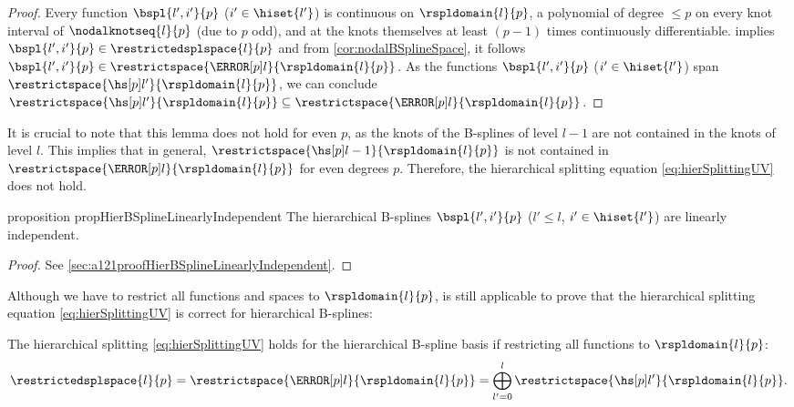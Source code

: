 \begin{proof}
  Every function $\bspl{l',i'}{p}$ ($i' \in \hiset{l'}$) is continuous on
  $\rspldomain{l}{p}$, a polynomial of degree $\le p$ on every knot interval
  of $\nodalknotseq{l}{p}$ (due to $p$ odd),
  and at the knots themselves at least $(p - 1)$ times continuously
  differentiable.
   implies $\bspl{l',i'}{p} \in \restrictedsplspace{l}{p}$
  and from \cref{cor:nodalBSplineSpace}, it follows
  $\bspl{l',i'}{p} \in \restrictspace{\nsbspl{l}{p}}{\rspldomain{l}{p}}$.
  As the functions $\bspl{l',i'}{p}$ ($i' \in \hiset{l'}$) span
  $\restrictspace{\hsbspl{l'}{p}}{\rspldomain{l}{p}}$, we can conclude
  $\restrictspace{\hsbspl{l'}{p}}{\rspldomain{l}{p}} \subset \restrictspace{\nsbspl{l}{p}}{\rspldomain{l}{p}}$.
\end{proof}

\vspace{1em}

It is crucial to note that this lemma does not hold for even $p$,
as the knots of the B-splines of level $l - 1$ are not contained in the
knots of level $l$.
This implies that in general,
$\restrictspace{\hsbspl{l-1}{p}}{\rspldomain{l}{p}}$
is not contained in $\restrictspace{\nsbspl{l}{p}}{\rspldomain{l}{p}}$
for even degrees $p$.
Therefore, the hierarchical splitting equation \eqref{eq:hierSplittingUV}
does not hold.

\begin{restatable}{%
  proposition%
}{%
  propHierBSplineLinearlyIndependent%
}
  \label{prop:hierBSplineLinearlyIndependent}
  The hierarchical B-splines
  $\bspl{l',i'}{p}$ ($l' \le l$, $i' \in \hiset{l'}$)
  are linearly independent.
\end{restatable}

\begin{proof}
  See \cref{sec:a121proofHierBSplineLinearlyIndependent}.
\end{proof}

\vspace{1em}

Although we have to restrict all functions and spaces to $\rspldomain{l}{p}$,
 is still applicable to prove that
the hierarchical splitting equation \eqref{eq:hierSplittingUV}
is correct for hierarchical B-splines:

\begin{corollary}
  \label{cor:hierSplittingBSpline}
  The hierarchical splitting \eqref{eq:hierSplittingUV}
  holds for the hierarchical B-spline basis
  if restricting all functions to $\rspldomain{l}{p}$:
  \begin{equation}
    \restrictedsplspace{l}{p}
    = \restrictspace{\nsbspl{l}{p}}{\rspldomain{l}{p}}
    = \bigoplus_{l'=0}^l \restrictspace{\hsbspl{l'}{p}}{\rspldomain{l}{p}}.
  \end{equation}
\end{corollary}

